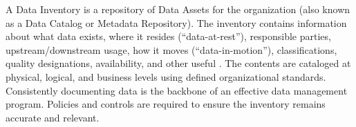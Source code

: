 %
%
A Data Inventory is a repository of Data Assets for the organization
(also known as a Data Catalog or Metadata Repository).
The inventory contains information about what data exists, where it resides (“data-at-rest”),
responsible parties, upstream/downstream usage, how it moves (“data-in-motion”),
classifications, quality designations,
availability, and other useful .
The contents are cataloged at physical, logical, and business levels using defined organizational standards.
Consistently documenting data is the backbone of an effective data management program.
Policies and controls are required to ensure the inventory remains accurate and relevant.
